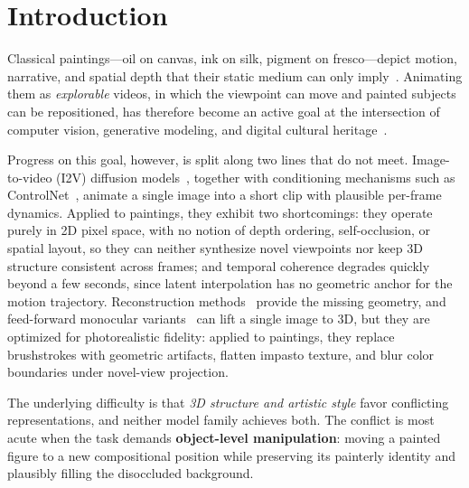 \section{Introduction}
\label{sec:intro}

Classical paintings---oil on canvas, ink on silk, pigment on
fresco---depict motion, narrative, and spatial depth that their static
medium can only imply~\cite{lowenthal2015heritage}. Animating them as
\emph{explorable} videos, in which the viewpoint can move and painted
subjects can be repositioned, has therefore become an active goal at
the intersection of computer vision, generative modeling, and digital
cultural heritage~\cite{dong2024enhancingpainting}.

Progress on this goal, however, is split along two lines that do not
meet. Image-to-video (I2V) diffusion
models~\cite{blattmann2023svd,wan2025,guo2023animatediff,yang2025cogvideox},
together with conditioning mechanisms such as
ControlNet~\cite{zhang2023controlnet,wang2025easycontrol,peng2024controlnext},
animate a single image into a short clip with plausible per-frame
dynamics. Applied to paintings, they exhibit two shortcomings: they
operate purely in 2D pixel space, with no notion of depth ordering,
self-occlusion, or spatial layout, so they can neither synthesize novel
viewpoints nor keep 3D structure consistent across frames; and temporal
coherence degrades quickly beyond a few seconds, since latent
interpolation has no geometric anchor for the motion trajectory.
Reconstruction methods~\cite{mildenhall2020nerf,kerbl20233dgs,huang20242dgs}
provide the missing geometry, and feed-forward monocular
variants~\cite{tripo2025tritosplat,tang2024dreamgaussian,charatan2024pixelsplat}
can lift a single image to 3D, but they are optimized for photorealistic
fidelity: applied to paintings, they replace brushstrokes with geometric
artifacts, flatten impasto texture, and blur color boundaries under
novel-view projection.

The underlying difficulty is that \emph{3D structure and artistic style}
favor conflicting representations, and neither model family achieves
both. The conflict is most acute when the task demands
\textbf{object-level manipulation}: moving a painted figure to a new
compositional position while preserving its painterly identity and
plausibly filling the disoccluded background.


